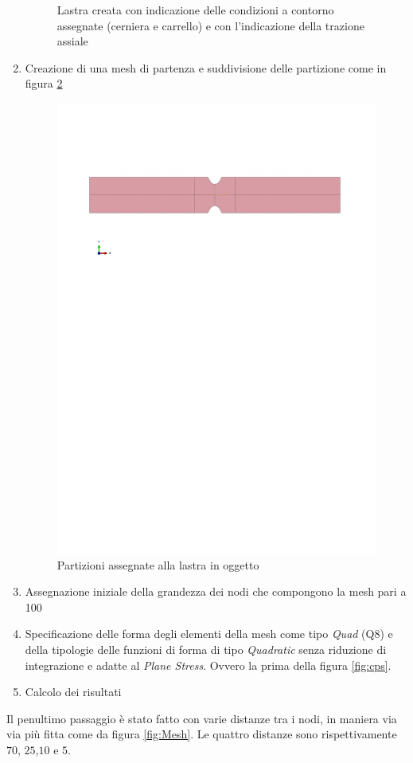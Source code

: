 \begin{enumerate}
\begin{figure}[htb]
        \caption{Lastra creata con indicazione delle condizioni a contorno assegnate (cerniera e carrello) e con l'indicazione della trazione assiale}
        \label{fig:LastraCaricata}
    \end{figure}
    \item Creazione di una mesh di partenza e suddivisione delle partizione come in figura \ref{fig:Partizioni}
    \begin{figure}[htb]
        \centering
        \includegraphics[width=\textwidth]{rel2/img2/Partizione.pdf}
        \caption{Partizioni assegnate alla lastra in oggetto}
        \label{fig:Partizioni}
    \end{figure}
    \item Assegnazione iniziale della grandezza dei nodi che compongono la mesh pari a \SI{100}{}
    \item Specificazione delle forma degli elementi della mesh come tipo \emph{Quad} (Q8) e della tipologie delle funzioni di forma di tipo \emph{Quadratic} senza riduzione di integrazione e adatte al \emph{Plane Stress}. Ovvero la prima della figura \ref{fig:cps}.
    \item Calcolo dei risultati
\end{enumerate}
Il penultimo passaggio è stato fatto con varie distanze tra i nodi, in maniera via via più fitta come da figura \ref{fig:Mesh}. Le quattro distanze sono rispettivamente $70$, $25$,$10$ e $5$.

